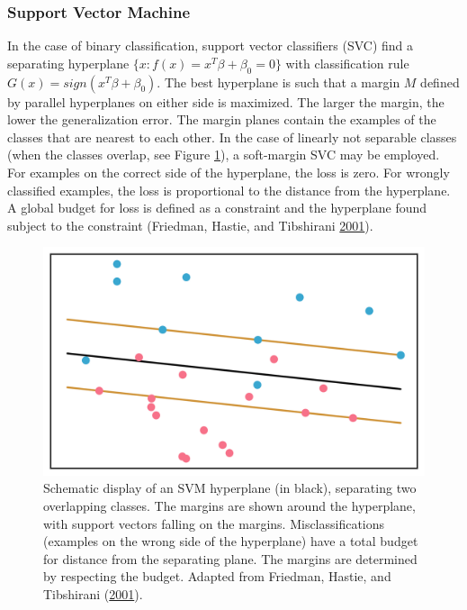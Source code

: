 \documentclass[
  11pt,
  a4paper,
  DIV=12,captions=tableheading,oneside,titlepage]{scrbook}
\begin{document}
\hypertarget{support-vector-machine}{%
\subsubsection{Support Vector Machine}\label{support-vector-machine}}

In the case of binary classification, support vector classifiers (SVC) find a separating hyperplane \(\{x: f(x)=x^T\beta+\beta_0 = 0\}\) with classification rule \(G(x)=sign(x^T\beta+\beta_0)\). The best hyperplane is such that a margin \(M\) defined by parallel hyperplanes on either side is maximized. The larger the margin, the lower the generalization error. The margin planes contain the examples of the classes that are nearest to each other. In the case of linearly not separable classes (when the classes overlap, see Figure \ref{fig:svm-schematic-plot}), a soft-margin SVC may be employed. For examples on the correct side of the hyperplane, the loss is zero. For wrongly classified examples, the loss is proportional to the distance from the hyperplane. A global budget for loss is defined as a constraint and the hyperplane found subject to the constraint (Friedman, Hastie, and Tibshirani \protect\hyperlink{ref-friedman2001elements}{2001}).



\begin{figure}

{\centering \includegraphics[width=0.7\linewidth]{figures/methods/svm-schematic} 

}

\caption{Schematic display of an SVM hyperplane (in black), separating two overlapping classes. The margins are shown around the hyperplane, with support vectors falling on the margins. Misclassifications (examples on the wrong side of the hyperplane) have a total budget for distance from the separating plane. The margins are determined by respecting the budget. Adapted from Friedman, Hastie, and Tibshirani (\protect\hyperlink{ref-friedman2001elements}{2001}).}\label{fig:svm-schematic-plot}
\end{figure}
\end{document}
